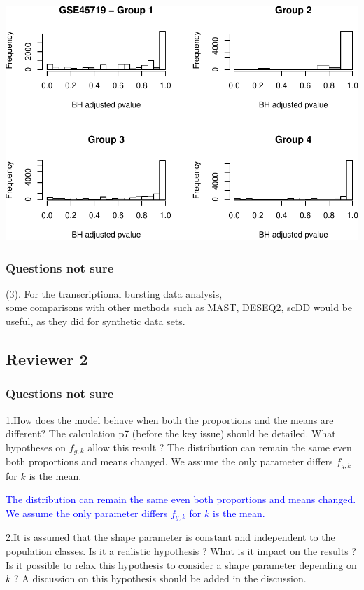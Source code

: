 \documentclass[]{article}
\begin{document}
\includegraphics{Revision_files/figure-latex/unnamed-chunk-1-2.pdf}

\subsubsection{Questions not sure}\label{questions-not-sure}

(3). For the transcriptional bursting data analysis,\\
some comparisons with other methods such as MAST, DESEQ2, scDD would be
useful, as they did for synthetic data sets.

\subsection{Reviewer 2}\label{reviewer-2}

\subsubsection{Questions not sure}\label{questions-not-sure-1}

1.How does the model behave when both the proportions and the means are
different? The calculation p7 (before the key issue) should be detailed.
What hypotheses on \(f_{g,k}\) allow this result ? The distribution can
remain the same even both proportions and means changed. We assume the
only parameter differs \(f_{g,k}\) for \(k\) is the mean.

\textcolor{blue}{The distribution can remain the same even both proportions and means changed. 
We assume the only parameter differs $f_{g,k}$ for $k$ is the mean.}

2.It is assumed that the shape parameter is constant and independent to
the population classes. Is it a realistic hypothesis ? What is it impact
on the results ? Is it possible to relax this hypothesis to consider a
shape parameter depending on \(k\) ? A discussion on this hypothesis
should be added in the discussion.
\end{document}
